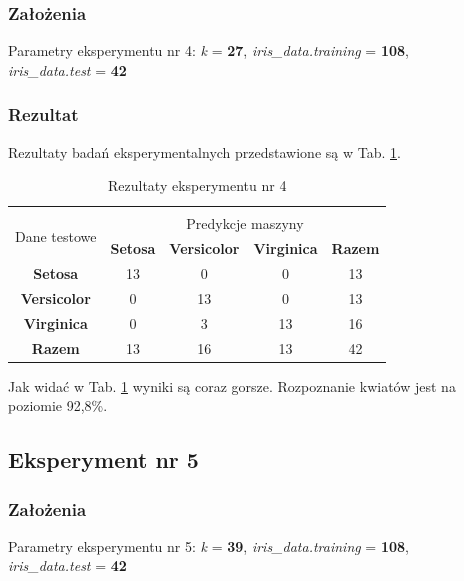 \documentclass[12pt]{article}
\begin{document}
\subsubsection{Założenia}

Parametry eksperymentu nr 4: \textit{k} = \textbf{27}, \textit{iris\_data.training} = \textbf{108}, \\ \textit{iris\_data.test} = \textbf{42}

\subsubsection{Rezultat}

Rezultaty badań eksperymentalnych przedstawione są w Tab. \ref{wyniki4}.
\begin{table}[ht!]
 \centering
 \vspace{0.2cm}
  \begin{tabular}{|*{5}{c|}}
  \hline\\[-0.5cm]
   \multirow{2}{*}{Dane testowe} & \multicolumn{4}{c|}{Predykcje maszyny} \\ \cline{2-5}
   & \textbf{Setosa} & \textbf{Versicolor} & \textbf{Virginica} & \textbf{Razem}\\
  \hline
   \textbf{Setosa} & 13 & 0 & 0 & 13  \\ \hline
   \textbf{Versicolor} & 0 & 13 & 0 & 13  \\ \hline
   \textbf{Virginica} & 0 &  3 & 13 & 16  \\ \hline
   \textbf{Razem} & 13 & 16 & 13 & 42 \\
  \hline
 \end{tabular}
 \caption{Rezultaty eksperymentu nr 4}
 \label{wyniki4}
\end{table}

\noindent Jak widać w Tab. \ref{wyniki4} wyniki są coraz gorsze. Rozpoznanie kwiatów jest na poziomie 92,8\%.\newline

\subsection{Eksperyment nr 5}
\subsubsection{Założenia}

Parametry eksperymentu nr 5: \textit{k} = \textbf{39}, \textit{iris\_data.training} = \textbf{108}, \\ \textit{iris\_data.test} = \textbf{42}
\end{document}
